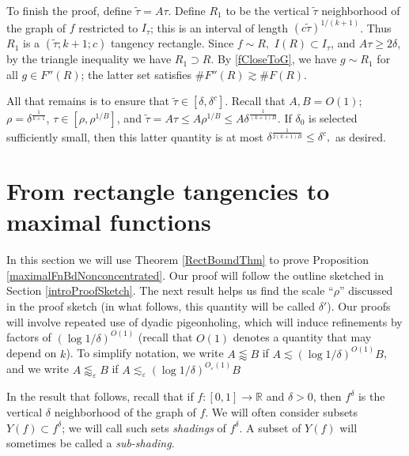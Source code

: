 \documentclass[letterpaper, reqno,11pt]{article}
\numberwithin{equation}{section}
\newcommand{\RR}{\mathbb{R}}
\newcommand{\eps}{\varepsilon}
\numberwithin{thm}{section}
\theoremstyle{remark}
\begin{document}
To finish the proof, define $\tilde\tau = A\tau$. Define $R_1$ to be the vertical $\tilde\tau$ neighborhood of the graph of $f$ restricted to $I_\tau$; this is an interval of length $(c\tilde\tau)^{1/(k+1)}$. Thus $R_1$ is a $(\tilde\tau; k+1; c)$ tangency rectangle.  Since $f\sim R,$ $I(R)\subset I_\tau$, and $A\tau\geq 2\delta$, by the triangle inequality we have $R_1\supset R$. By \eqref{fCloseToG}, we have $g\sim R_1$ for all $g\in F''(R)$; the latter set satisfies $\#F''(R)\gtrsim\#F(R)$. 

All that remains is to ensure that $\tilde\tau \in [\delta, \delta^c]$. Recall that $A,B = O(1)$; $\rho = \delta^{\frac{1}{k+1}}$, $\tau \in [\rho, \rho^{1/B}]$, and $\tilde\tau = A\tau\leq A\rho^{1/B} \leq A \delta^{\frac{1}{(k+1)B}}$.  If $\delta_0$ is selected sufficiently small, then this latter quantity is at most $\delta^{\frac{1}{2(k+1)B}}\leq \delta^c,$ as desired. 



\section{From rectangle tangencies to maximal functions}\label{tangenciesToMaximalFnSection}
In this section we will use Theorem  \ref{RectBoundThm} to prove Proposition \ref{maximalFnBdNonconcentrated}. Our proof will follow the outline sketched in Section \ref{introProofSketch}. The next result helps us find the scale ``$\rho$'' discussed in the proof sketch (in what follows, this quantity will be called $\delta'$). Our proofs will involve repeated use of dyadic pigeonholing, which will induce refinements by factors of $(\log 1/\delta)^{O(1)}$ (recall that $O(1)$ denotes a quantity that may depend on $k$). To simplify notation, we write $A\lessapprox B$ if $A\lesssim (\log 1/\delta)^{O(1)}B$, and we write $A\lessapprox_\eps B$ if $A\lesssim_\eps (\log 1/\delta)^{O_\eps(1)}B$ 

In the result that follows, recall that if $f \colon[0,1]\to\RR$ and $\delta>0$, then $f^\delta$ is the vertical $\delta$ neighborhood of the graph of $f$. We will often consider subsets $Y(f)\subset f^\delta$; we will call such sets \emph{shadings} of $f^\delta$. A subset of $Y(f)$ will sometimes be called a \emph{sub-shading}.
\end{document}
